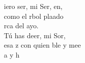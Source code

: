 \begin{cancion}%
	iero ser, mi Ser, en,\\
	como el rbol plaado\\
	rca del ayo.\\
	Tú has deer, mi Sor,\\
	esa z con quien ble y mee\\
	a y h \\
\end{cancion}%
